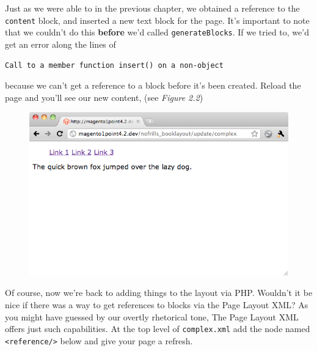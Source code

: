 \documentclass[oneside]{book}
\begin{document}
Just as we were able to in the previous chapter, we obtained a reference to the \footnotesize\texttt{content} \normalsize  block, and inserted a new text block for the page.  It's important to note that we couldn't do this \textbf{before} we'd called  \footnotesize\texttt{generateBlocks}\normalsize. If we tried to, we'd get an error along the lines of 

\begin{lstlisting}
Call to a member function insert() on a non-object 

\end{lstlisting}


because we can't get a reference to a block before it's been created.  Reload the page and you'll see our new content, (see \emph{Figure 2.2})

\begin{figure}[htb]
\begin{center}
\leavevmode
\includegraphics[width=1\textwidth]{images/chapter2/with-content.png}
\end{center}
\caption{}
\end{figure}


Of course, now we're back to adding things to the layout via PHP.  Wouldn't it be nice if there was a way to get references to blocks via the Page Layout XML? As you might have guessed by our overtly rhetorical tone, The Page Layout XML offers just such capabilities.  At the top level of \footnotesize\texttt{complex.xml} \normalsize  add the node named \footnotesize\texttt{\textless reference/\textgreater } \normalsize  below and give your page a refresh.
\end{document}
